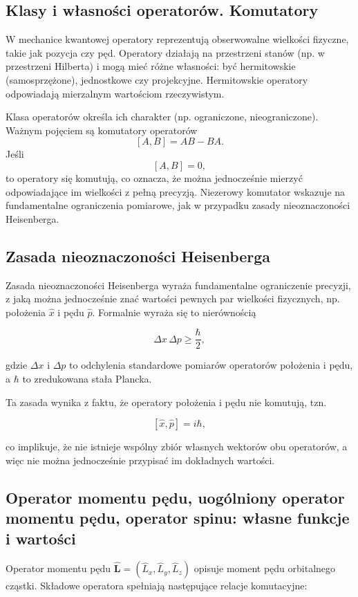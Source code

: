 \subsection{Klasy i własności operatorów. Komutatory}

W mechanice kwantowej operatory reprezentują obserwowalne wielkości fizyczne, takie jak pozycja czy pęd. Operatory działają na przestrzeni stanów (np. w przestrzeni Hilberta) i mogą mieć różne własności: być hermitowskie (samosprzężone), jednostkowe czy projekcyjne. Hermitowskie operatory odpowiadają mierzalnym wartościom rzeczywistym.

Klasa operatorów określa ich charakter (np. ograniczone, nieograniczone). Ważnym pojęciem są komutatory operatorów
\[
[A, B] = AB - BA.
\]
Jeśli
\[
[A, B] = 0,
\]
to operatory się komutują, co oznacza, że można jednocześnie mierzyć odpowiadające im wielkości z pełną precyzją. Niezerowy komutator wskazuje na fundamentalne ograniczenia pomiarowe, jak w przypadku zasady nieoznaczoności Heisenberga.

\subsection{Zasada nieoznaczoności Heisenberga}

Zasada nieoznaczoności Heisenberga wyraża fundamentalne ograniczenie precyzji, z jaką można jednocześnie znać wartości pewnych par wielkości fizycznych, np. położenia \( \hat{x} \) i pędu \( \hat{p} \). Formalnie wyraża się to nierównością

\[
\Delta x \, \Delta p \geq \frac{\hbar}{2},
\]

gdzie \( \Delta x \) i \( \Delta p \) to odchylenia standardowe pomiarów operatorów położenia i pędu, a \( \hbar \) to zredukowana stała Plancka.

Ta zasada wynika z faktu, że operatory położenia i pędu nie komutują, tzn.

\[
[\hat{x}, \hat{p}] = i \hbar,
\]

co implikuje, że nie istnieje wspólny zbiór własnych wektorów obu operatorów, a więc nie można jednocześnie przypisać im dokładnych wartości.

\subsection{Operator momentu pędu, uogólniony operator momentu pędu, operator spinu: własne funkcje i wartości}


Operator momentu pędu \(\hat{\mathbf{L}} = (\hat{L}_x, \hat{L}_y, \hat{L}_z)\) opisuje moment pędu orbitalnego cząstki. Składowe operatora spełniają następujące relacje komutacyjne:

